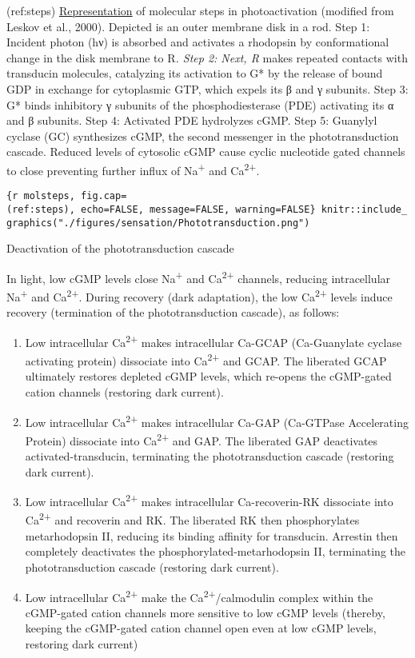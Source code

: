 (ref:steps)
\href{https://commons.wikimedia.org/wiki/File:Phototransduction.png}{Representation}
of molecular steps in photoactivation (modified from Leskov et al.,
2000). Depicted is an outer membrane disk in a rod. Step 1: Incident
photon (hν) is absorbed and activates a rhodopsin by conformational
change in the disk membrane to R\emph{. Step 2: Next, R} makes repeated
contacts with transducin molecules, catalyzing its activation to G* by
the release of bound GDP in exchange for cytoplasmic GTP, which expels
its β and γ subunits. Step 3: G* binds inhibitory γ subunits of the
phosphodiesterase (PDE) activating its α and β subunits. Step 4:
Activated PDE hydrolyzes cGMP. Step 5: Guanylyl cyclase (GC) synthesizes
cGMP, the second messenger in the phototransduction cascade. Reduced
levels of cytosolic cGMP cause cyclic nucleotide gated channels to close
preventing further influx of Na\textsuperscript{+} and
Ca\textsuperscript{2+}.

\texttt{\{r\ molsteps,\ fig.cap=\textquotesingle{}(ref:steps)\textquotesingle{},\ echo=FALSE,\ message=FALSE,\ warning=FALSE\}\ knitr::include\_graphics("./figures/sensation/Phototransduction.png")}

Deactivation of the phototransduction cascade

In light, low cGMP levels close Na\textsuperscript{+} and
Ca\textsuperscript{2+} channels, reducing intracellular
Na\textsuperscript{+} and Ca\textsuperscript{2+}. During recovery (dark
adaptation), the low Ca\textsuperscript{2+} levels induce recovery
(termination of the phototransduction cascade), as follows:

\begin{enumerate}
\def\labelenumi{\arabic{enumi}.}
\tightlist
\item
  Low intracellular Ca\textsuperscript{2+} makes intracellular Ca-GCAP
  (Ca-Guanylate cyclase activating protein) dissociate into
  Ca\textsuperscript{2+} and GCAP. The liberated GCAP ultimately
  restores depleted cGMP levels, which re-opens the cGMP-gated cation
  channels (restoring dark current).
\item
  Low intracellular Ca\textsuperscript{2+} makes intracellular Ca-GAP
  (Ca-GTPase Accelerating Protein) dissociate into
  Ca\textsuperscript{2+} and GAP. The liberated GAP deactivates
  activated-transducin, terminating the phototransduction cascade
  (restoring dark current).
\item
  Low intracellular Ca\textsuperscript{2+} makes intracellular
  Ca-recoverin-RK dissociate into Ca\textsuperscript{2+} and recoverin
  and RK. The liberated RK then phosphorylates metarhodopsin II,
  reducing its binding affinity for transducin. Arrestin then completely
  deactivates the phosphorylated-metarhodopsin II, terminating the
  phototransduction cascade (restoring dark current).
\item
  Low intracellular Ca\textsuperscript{2+} make the
  Ca\textsuperscript{2+}/calmodulin complex within the cGMP-gated cation
  channels more sensitive to low cGMP levels (thereby, keeping the
  cGMP-gated cation channel open even at low cGMP levels, restoring dark
  current)
\end{enumerate}

